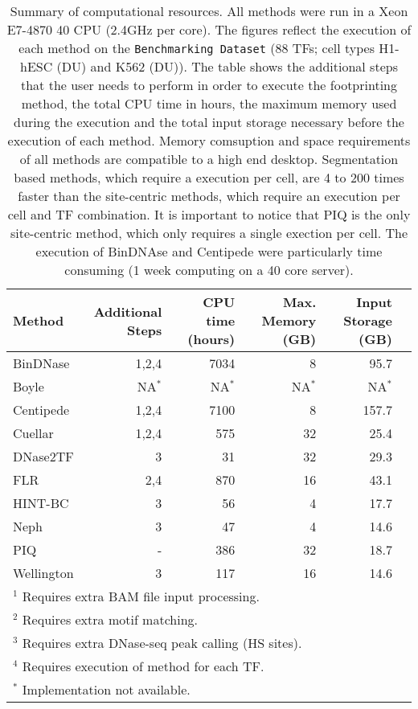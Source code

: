 \begin{table}[h]
\begin{center}
\caption{Summary of computational resources. All methods were run in a Xeon E7-4870 40 CPU (2.4GHz per core). The figures reflect the execution of each method on the {\tt Benchmarking Dataset} (88 TFs; cell types H1-hESC (DU) and K562 (DU)). The table shows the additional steps that the user needs to perform in order to execute the footprinting method, the total CPU time in hours, the maximum memory used during the execution and the total input storage necessary before the execution of each method. Memory comsuption and space requirements of all methods are compatible to a high end desktop. Segmentation based methods, which require a execution per cell, are 4 to 200 times faster than the site-centric methods, which require an execution per cell and TF combination. It is important to notice that PIQ is the only site-centric method, which only requires a single exection per cell. The execution of BinDNAse and Centipede were particularly time consuming (1 week computing on a 40 core server).}
\label{tab:comp.resource}
\renewcommand{\arraystretch}{1.2}
\begin{tabularx}{\textwidth}{ lrrrrr }
\hline
Method & Additional Steps & CPU time (hours) & Max. Memory (GB) & Input Storage (GB) \\
\hline
BinDNase & 1,2,4 & 7034 & 8 & 95.7 \\
Boyle & NA$^*$ & NA$^*$ & NA$^*$ & NA$^*$ \\
Centipede & 1,2,4 & 7100 & 8 & 157.7 \\
Cuellar & 1,2,4 & 575 & 32 & 25.4 \\
DNase2TF & 3 & 31 & 32 & 29.3 \\
FLR & 2,4 & 870 & 16 & 43.1 \\
HINT-BC & 3 & 56 & 4 & 17.7 \\
Neph & 3 & 47 & 4 & 14.6 \\
PIQ & - & 386 & 32 & 18.7 \\
Wellington & 3 & 117 & 16 & 14.6 \\
\hline
\multicolumn{6}{l}{$^1$ Requires extra BAM file input processing.} \\
\multicolumn{6}{l}{$^2$ Requires extra motif matching.} \\
\multicolumn{6}{l}{$^3$ Requires extra DNase-seq peak calling (HS sites).} \\
\multicolumn{6}{l}{$^4$ Requires execution of method for each TF.} \\
\multicolumn{6}{l}{$^*$ Implementation not available.} \\
\end{tabularx}
\end{center}
\end{table}

